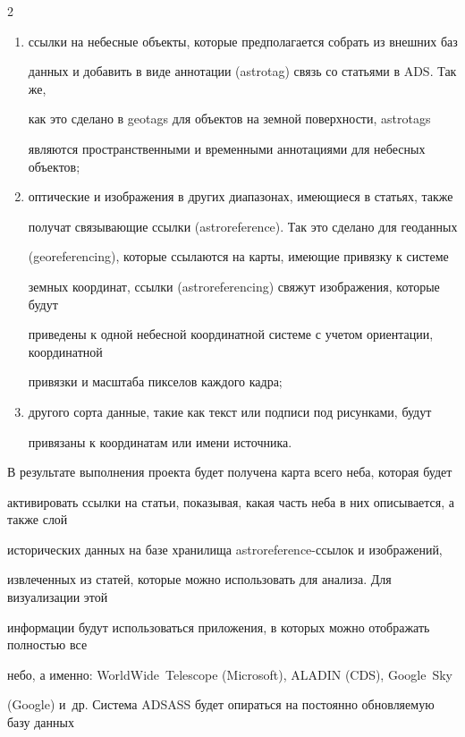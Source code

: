 \begin{multicols}{2}
      \begin{enumerate}[(1)]

\item ссылки на небесные объекты, которые предполагается собрать из внешних баз 

данных и добавить в виде аннотации (astrotag) связь со стать\-ями в ADS. Так же, 

как это сделано в geotags для объектов на земной поверхности, astrotags 

являются пространственными и временными аннотациями для небесных объектов;

\item оптические и изображения в других диапазонах, имеющиеся в стать\-ях, также 

получат связывающие ссылки (astroreference). Так это сделано для геоданных 

(georeferencing), которые ссылаются на карты, имеющие привязку к сис\-те\-ме 

земных координат, ссылки (astroreferencing) свяжут изображения, которые будут 

приведены к одной небесной координатной сис\-те\-ме с учетом ориентации, координатной 

привязки и масштаба пикселов каждого кадра; 

\item другого сорта данные, такие как текст или подписи под рисунками, будут 

привязаны к координатам или имени источника. 

\end{enumerate}



В результате выполнения проекта будет получена карта всего неба, которая будет 

активировать ссылки на статьи, показывая, какая часть неба в них описывается, а также слой 

исторических данных на базе хранилища astroreference-ссы\-лок и изоб\-ра\-же\-ний, 

извлеченных из статей, которые можно использовать для анализа. Для визуализации этой 

информации будут использоваться приложения, в которых можно отображать полностью все 

небо, а именно: WorldWide\ Telescope (Microsoft), ALADIN (CDS), Google\ Sky 

(Google) и~др. Сис\-те\-ма ADSASS будет опираться на постоянно об\-нов\-ля\-емую базу данных 


\end{multicols}
